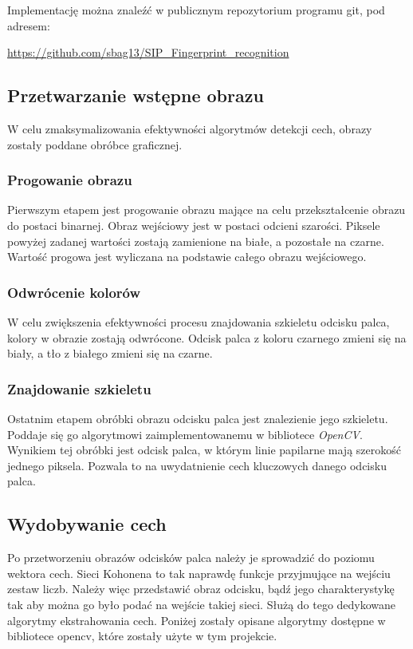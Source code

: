 \documentclass[12pt, notitlepage]{article}
\begin{document}
Implementację można znaleźć w publicznym repozytorium programu git, pod adresem:
\begin{center}
    \url{https://github.com/sbag13/SIP_Fingerprint_recognition}
\end{center}

\subsection{Przetwarzanie wstępne obrazu}\label{sec:preprocesing}
W celu zmaksymalizowania efektywności algorytmów detekcji cech, obrazy zostały poddane obróbce graficznej.

\subsubsection{Progowanie obrazu}
Pierwszym etapem jest progowanie obrazu mające na celu przekształcenie obrazu do postaci binarnej. Obraz wejściowy jest w postaci odcieni szarości. Piksele powyżej zadanej wartości zostają zamienione na białe, a pozostałe na czarne. Wartość progowa jest wyliczana na podstawie całego obrazu wejściowego. 

\subsubsection{Odwrócenie kolorów}
W celu zwiększenia efektywności procesu znajdowania szkieletu odcisku palca, kolory w obrazie zostają odwrócone. Odcisk palca z koloru czarnego zmieni się na biały, a tło z białego zmieni się na czarne. 

\subsubsection{Znajdowanie szkieletu}
Ostatnim etapem obróbki obrazu odcisku palca jest znalezienie jego szkieletu. Poddaje się go algorytmowi zaimplementowanemu w bibliotece \textit{OpenCV}. Wynikiem tej obróbki jest odcisk palca, w którym linie papilarne mają szerokość jednego piksela. Pozwala to na uwydatnienie cech kluczowych danego odcisku palca.

\subsection{Wydobywanie cech}\label{sec:extraction}

Po przetworzeniu obrazów odcisków palca należy je sprowadzić do poziomu wektora cech. Sieci Kohonena to tak naprawdę funkcje przyjmujące na wejściu zestaw liczb. Należy więc przedstawić obraz odcisku, bądź jego charakterystykę tak aby można go było podać na wejście takiej sieci. Służą do tego dedykowane algorytmy ekstrahowania cech. Poniżej zostały opisane algorytmy dostępne w bibliotece opencv\cite{opencv}, które zostały użyte w tym projekcie.
\end{document}
